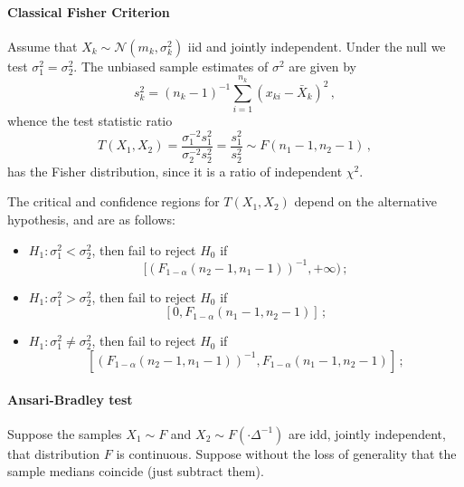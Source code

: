\documentclass[a4paper,14pt]{extarticle}
\newcommand{\Ncal}{\mathcal{N}}
\begin{document}
\paragraph{Classical Fisher Criterion} %
\label{par:classical_fisher_criterion}
Assume that $X_k \sim \Ncal(m_k, \sigma^2_k)$ iid and jointly independent. Under
the null we test $\sigma^2_1=\sigma^2_2$. The unbiased sample estimates of $\sigma^2$
are given by
$$ s^2_k = (n_k-1)^{-1} \sum_{i=1}^{n_k} (x_{ki} - \bar{X}_k)^2 \,,$$
whence the test statistic ratio
$$ T(X_1, X_2)
    = \frac{\sigma^{-2}_1 s^2_1}{\sigma^{-2}_2 s^2_2}
    = \frac{s^2_1}{s^2_2}
    \sim F(n_1-1, n_2-1) \,, $$
has the Fisher distribution, since it is a ratio of independent $\chi^2$.

The critical and confidence regions for $T(X_1, X_2)$ depend on the alternative
hypothesis, and are as follows: \begin{itemize}
    \item $H_1: \sigma^2_1 < \sigma^2_2$, then fail to reject $H_0$ if
    $$ [(F_{1-\alpha}(n_2-1, n_1-1))^{-1}, +\infty) \,;$$
    \item $H_1: \sigma^2_1 > \sigma^2_2$, then fail to reject $H_0$ if
    $$ [0, F_{1-\alpha}(n_1-1, n_2-1)] \,; $$
    \item $H_1: \sigma^2_1 \neq \sigma^2_2$, then fail to reject $H_0$ if
    $$ [(F_{1-\alpha}(n_2-1, n_1-1))^{-1}, F_{1-\alpha}(n_1-1, n_2-1)] \,; $$
\end{itemize}


\paragraph{Ansari-Bradley test} %
\label{par:ansari_bradley_test}
Suppose the samples $X_1\sim F$ and $X_2\sim F(\cdot\Delta^{-1})$ are idd, jointly
independent, that distribution $F$ is continuous. Suppose without the loss of generality
that the sample medians coincide (just subtract them).
\end{document}
